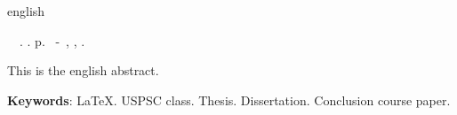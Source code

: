 \begin{resumo}[Abstract]
 \begin{otherlanguage*}{english}
	\begin{flushleft} 
		\setlength{\absparsep}{0pt} %
 		\SingleSpacing 
 		\imprimirautorabr~~\textbf{\imprimirtitleabstract}.	\imprimirdata.  \pageref{LastPage}p. 
		\imprimirtipotrabalho~-~\imprimirinstituicao, \imprimirlocal, 	\imprimirdata. 
 	\end{flushleft}
	\OnehalfSpacing 
   This is the english abstract.

   \vspace{\onelineskip}
 
   \noindent 
   \textbf{Keywords}: LaTeX. USPSC class. Thesis. Dissertation. Conclusion course paper. 
 \end{otherlanguage*}
\end{resumo}
